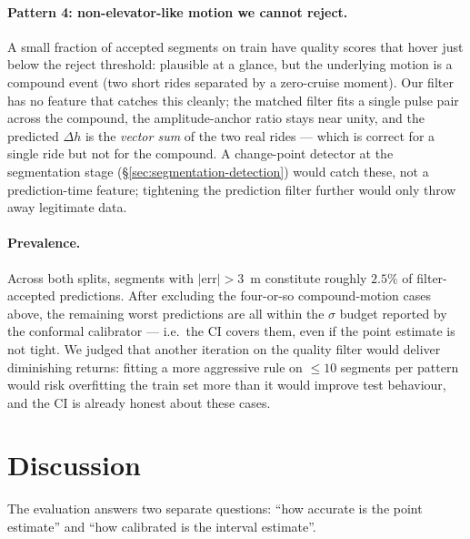 \paragraph{Pattern 4: non-elevator-like motion we cannot reject.}
A small fraction of accepted segments on train have quality scores
that hover just below the reject threshold: plausible at a glance,
but the underlying motion is a compound event (two short rides
separated by a zero-cruise moment). Our filter has no feature that
catches this cleanly; the matched filter fits a single pulse pair
across the compound, the amplitude-anchor ratio stays near unity,
and the predicted $\Delta h$ is the \emph{vector sum} of the two
real rides — which is correct for a single ride but not for the
compound. A change-point detector at the segmentation stage
(\S\ref{sec:segmentation-detection}) would catch these, not a
prediction-time feature; tightening the prediction filter further
would only throw away legitimate data.

\paragraph{Prevalence.} Across both splits, segments with
$|\mathrm{err}|>3$~m constitute roughly $2.5\%$ of filter-accepted
predictions. After excluding the four-or-so compound-motion cases
above, the remaining worst predictions are all within the $\sigma$
budget reported by the conformal calibrator — i.e.\ the CI covers
them, even if the point estimate is not tight. We judged that
another iteration on the quality filter would deliver diminishing
returns: fitting a more aggressive rule on $\le 10$ segments per
pattern would risk overfitting the train set more than it would
improve test behaviour, and the CI is already honest about these
cases.

\section{Discussion}
\label{sec:prediction-discussion}

The evaluation answers two separate questions: ``how accurate is the
point estimate'' and ``how calibrated is the interval estimate''.

